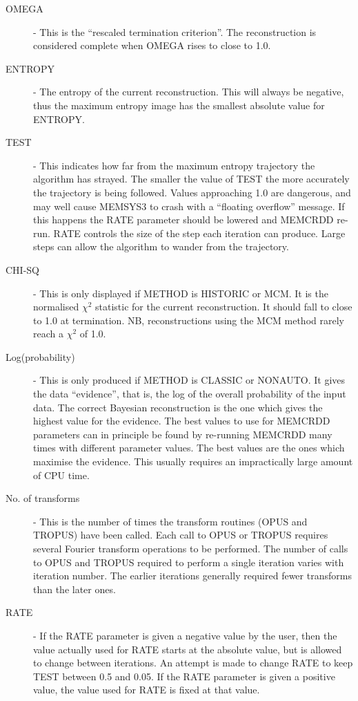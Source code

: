 \begin {description}
\item [OMEGA] - This is the ``rescaled termination criterion''. The
reconstruction is considered complete when OMEGA rises to close to 1.0.
\item [ENTROPY] - The entropy of the current reconstruction. This will always
be negative, thus the maximum entropy image has the smallest
absolute value for ENTROPY.

\item [TEST] - This indicates how far from the maximum entropy trajectory the
algorithm has strayed. The smaller the value of TEST the more accurately the
trajectory is being followed. Values approaching 1.0 are dangerous, and may
well  cause MEMSYS3 to crash with a ``floating overflow'' message. If this
happens the  RATE parameter should be lowered and MEMCRDD re-run. RATE controls
the size of  the step each iteration can produce. Large steps can allow the
algorithm to  wander from the trajectory.

\item [CHI-SQ] - This is only displayed if METHOD is HISTORIC or MCM. It is the
normalised $\chi^{2}$ statistic for the current reconstruction. It should fall
to close to 1.0 at termination. NB, reconstructions using the MCM method
rarely reach a $\chi^{2}$ of 1.0.
\item [Log(probability)] - This is only produced if METHOD is CLASSIC or
NONAUTO. It gives the data ``evidence'', that is, the log of the overall
probability of the
input data. The correct Bayesian reconstruction is the one which gives the
highest value for the evidence. The best values to use for MEMCRDD parameters
can in principle be found by re-running MEMCRDD many times with different
parameter values. The best values are the ones which maximise the evidence.
This usually requires an impractically large amount of CPU time.

\item [No. of transforms] - This is the number of times the transform routines
(OPUS and TROPUS) have been called. Each call to OPUS or TROPUS requires
several  Fourier transform operations to be performed. The number of calls to
OPUS and  TROPUS required to perform a single iteration varies with iteration
number.  The earlier iterations generally required fewer transforms than the
later ones.

\item [RATE] - If the RATE parameter is given a negative value by the user,
then  the value actually used for RATE starts at the absolute value, but is
allowed to  change between iterations. An attempt is made to change RATE to
keep TEST  between 0.5 and 0.05. If the RATE parameter is given a positive
value, the value used for RATE is fixed at that value.

\end {description}

